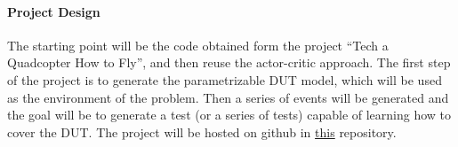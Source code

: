 \documentclass{article}
\begin{document}
\paragraph{Project Design}

The starting point will be the code obtained form the project ``Tech a Quadcopter How to Fly'', and then reuse the actor-critic approach. The first step of the project is to generate the parametrizable DUT model, which will be used as the environment of the problem. Then a series of events will be generated and the goal will be to generate a test (or a series of tests) capable of learning how to cover the DUT. The project will be hosted on github in \href{git@github.com:birio/capstone_project.git}{this} repository.


 
\end{document}
